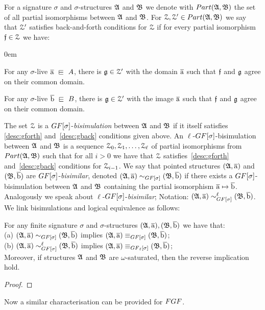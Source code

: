 \documentclass[a4paper, UKenglish, cleveref, numberwithinsect, autoref]{lipics-v2021}
\begin{document}
For a signature $\sigma$ and $\sigma$-structures ${\mathfrak{A}}$ and ${\mathfrak{B}}$ we denote with $\PartIso{\str{A}}{\str{B}}$ the set of all partial isomorphisms between ${\mathfrak{A}}$ and ${\mathfrak{B}}$. 
For $\bisimZ, \bisimZ' \in \PartIso{\str{A}}{\str{B}}$ we say that $\mathcal{Z}'$ satisfies back-and-forth conditions for $\mathcal{Z}$ if for every partial isomorphism $\mathfrak{f} \in \mathcal{Z}$ we have:
%
\begin{description}\itemsep0em
  \item[\desclabel{(gForth)}{desc:gforth}] For any $\sigma$-live $\elemtuplea \sqin A$, there is $\mathfrak{g} \in \mathcal{Z}'$ with the domain $\overline{\mathrm{a}}$ such that $\mathfrak{f}$ and $\mathfrak{g}$ agree on their common domain. 
  \item[\desclabel{(gBack)}{desc:gback}] For any $\sigma$-live $\elemtupleb \sqin B$, there is $\mathfrak{g} \in \mathcal{Z}'$ with the image $\overline{\mathrm{a}}$ such that $\mathfrak{f}$ and $\mathfrak{g}$ agree on their common domain. 
\end{description}
The set $\mathcal{Z}$ is a $\GF[\sigma]$-\emph{bisimulation} between ${\mathfrak{A}}$ and ${\mathfrak{B}}$ if it itself satisfies \ref{desc:gforth} and~\ref{desc:gback} conditions given above.
An $\ell$-$\GF[\sigma]$-bisimulation between ${\mathfrak{A}}$ and ${\mathfrak{B}}$ is a sequence $\mathcal{Z}_0, \mathcal{Z}_1, \ldots, \mathcal{Z}_\ell$ of partial isomorphisms from $\PartIso{\str{A}}{\str{B}}$ such that for all $i > 0$ we have that $\mathcal{Z}$ satisfies~\ref{desc:gforth} and~\ref{desc:gback} conditions for $\mathcal{Z}_{i{-}1}$.
We say that pointed structures $({\mathfrak{A}}, \overline{\mathrm{a}})$ and $({\mathfrak{B}}, \overline{\mathrm{b}})$ are $\GF[\sigma]$-\emph{bisimilar}, denoted $(\str{A}, \elemtuplea) \bisimto_{\GF[\sigma]} (\str{B}, \elemtupleb)$ if there exists a $\GF[\sigma]$-bisimulation  between ${\mathfrak{A}}$ and ${\mathfrak{B}}$ containing the partial isomorphism $\overline{\mathrm{a}} \mapsto \overline{\mathrm{b}}$.
Analogously we speak about $\ell$-$\GF[\sigma]$-\emph{bisimilar}; Notation: $(\str{A}, \elemtuplea) \bisimto_{\GF[\sigma]}^{\ell} (\str{B}, \elemtupleb)$.
We link bisimulations and logical equivalence as follows:

\begin{lemma}
For any finite signature $\sigma$ and $\sigma$-structures $({\mathfrak{A}}, \overline{\mathrm{a}}), ({\mathfrak{B}}, \overline{\mathrm{b}})$ we have that:\\
(a) $(\str{A}, \elemtuplea) \bisimto_{\GF[\sigma]} (\str{B}, \elemtupleb)$ implies $(\str{A}, \elemtuplea) \equiv_{\GF[\sigma]} (\str{B}, \elemtupleb)$;\\
(b) $(\str{A}, \elemtuplea) \bisimto_{\GF[\sigma]}^{\ell} (\str{B}, \elemtupleb)$ implies $(\str{A}, \elemtuplea) \equiv_{\GF_\ell[\sigma]} (\str{B}, \elemtupleb)$;\\
Moreover, if structures ${\mathfrak{A}}$ and ${\mathfrak{B}}$ are $\omega$-saturated, then the reverse implication hold.
\end{lemma}
\begin{proof}
\end{proof}

Now a similar characterisation can be provided for $\FGF$. 



\clearpage

\end{document}
